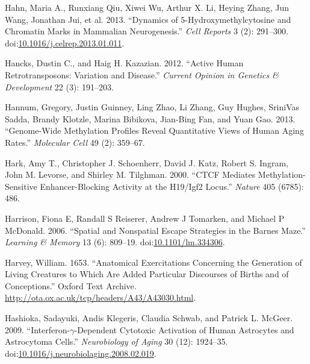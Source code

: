 \documentclass[onehalf,12pt]{beavtex}
\begin{document}
  \hypertarget{ref-HahnDynamics5HydroxymethylcytosineChromatin2013}{}
  Hahn, Maria A., Runxiang Qiu, Xiwei Wu, Arthur X. Li, Heying Zhang, Jun
  Wang, Jonathan Jui, et al. 2013. ``Dynamics of 5-Hydroxymethylcytosine
  and Chromatin Marks in Mammalian Neurogenesis.'' \emph{Cell Reports} 3
  (2): 291--300.
  doi:\href{https://doi.org/10.1016/j.celrep.2013.01.011}{10.1016/j.celrep.2013.01.011}.
  
  \hypertarget{ref-HancksActivehumanretrotransposons2012}{}
  Hancks, Dustin C., and Haig H. Kazazian. 2012. ``Active Human
  Retrotransposons: Variation and Disease.'' \emph{Current Opinion in
  Genetics \& Development} 22 (3): 191--203.
  
  \hypertarget{ref-HannumGenomewidemethylationprofiles2013}{}
  Hannum, Gregory, Justin Guinney, Ling Zhao, Li Zhang, Guy Hughes,
  SriniVas Sadda, Brandy Klotzle, Marina Bibikova, Jian-Bing Fan, and Yuan
  Gao. 2013. ``Genome-Wide Methylation Profiles Reveal Quantitative Views
  of Human Aging Rates.'' \emph{Molecular Cell} 49 (2): 359--67.
  
  \hypertarget{ref-HarkCTCFmediatesmethylationsensitive2000}{}
  Hark, Amy T., Christopher J. Schoenherr, David J. Katz, Robert S.
  Ingram, John M. Levorse, and Shirley M. Tilghman. 2000. ``CTCF Mediates
  Methylation-Sensitive Enhancer-Blocking Activity at the H19/Igf2
  Locus.'' \emph{Nature} 405 (6785): 486.
  
  \hypertarget{ref-HarrisonSpatialnonspatialescape2006}{}
  Harrison, Fiona E, Randall S Reiserer, Andrew J Tomarken, and Michael P
  McDonald. 2006. ``Spatial and Nonspatial Escape Strategies in the Barnes
  Maze.'' \emph{Learning \& Memory} 13 (6): 809--19.
  doi:\href{https://doi.org/10.1101/lm.334306}{10.1101/lm.334306}.
  
  \hypertarget{ref-HarveyAnatomicalexercitationsconcerning1653}{}
  Harvey, William. 1653. ``Anatomical Exercitations Concerning the
  Generation of Living Creatures to Which Are Added Particular Discourses
  of Births and of Conceptions.'' Oxford Text Archive.
  \url{http://ota.ox.ac.uk/tcp/headers/A43/A43030.html}.
  
  \hypertarget{ref-HashiokaInterferongdependentcytotoxicactivation2009}{}
  Hashioka, Sadayuki, Andis Klegeris, Claudia Schwab, and Patrick L.
  McGeer. 2009. ``Interferon-\(\gamma\)-Dependent Cytotoxic Activation of
  Human Astrocytes and Astrocytoma Cells.'' \emph{Neurobiology of Aging}
  30 (12): 1924--35.
  doi:\href{https://doi.org/10.1016/j.neurobiolaging.2008.02.019}{10.1016/j.neurobiolaging.2008.02.019}.
  
\end{document}
